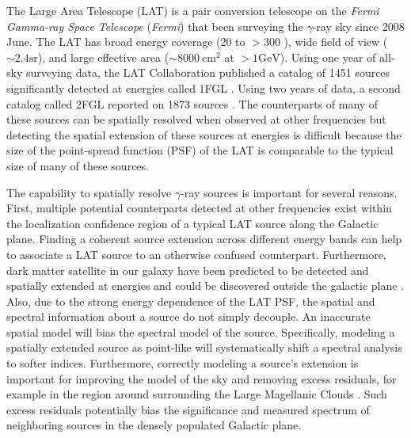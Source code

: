 \documentclass[12pt,preprint]{aastex}
\newcommand{\mev}{\text{MeV}\xspace}
\newcommand{\gev}{\text{GeV}\xspace}
\newcommand{\sr}{\text{sr}\xspace}
\newcommand{\cm}{\text{cm}\xspace}
\newcommand{\fermi}{\textit{Fermi}\xspace}
\begin{document}
{The Large Area Telescope (LAT) is a pair conversion telescope on the
{\em \fermi Gamma-ray Space Telescope} (\fermi) that been surveying the
$\gamma$-ray sky since 2008 June.  The LAT has broad energy coverage
(20 \mev to $>300$ \gev), wide field of view ($\sim 2.4 \sr$), and large
effective area ($\sim 8000\ \cm^2$ at $>1 \gev$).  
Using one year of all-sky surveying data, the LAT Collaboration published
a catalog of 1451 sources significantly detected at \gev energies called 1FGL \citep{first_cat}.
Using two years of data, a second catalog called 2FGL reported on 1873
sources \citep{second_cat}.
The counterparts of many of these sources can be spatially resolved
when observed at other frequencies but detecting the spatial extension
of these sources at \gev energies is difficult because the size of the
point-spread function (PSF) of the LAT is comparable to the typical size
of many of these sources.

The capability to spatially resolve \gev $\gamma$-ray
sources is important for several reasons.  First, multiple potential
counterparts detected at other frequencies exist within the localization
confidence region of a typical LAT source along the Galactic plane.
Finding a coherent source extension across different energy bands can
help to associate a LAT source to an otherwise confused counterpart.
Furthermore, dark matter satellite in our galaxy have been predicted to be
detected and spatially extended at \gev energies and could be discovered
outside the galactic plane \citep{pre_luanch_dark_matter_fermi}.  Also,
due to the strong energy dependence of the LAT PSF, the spatial and
spectral information about a source do not simply decouple. An inaccurate
spatial model will bias the spectral model of the source. Specifically,
modeling a spatially extended source as point-like will systematically
shift a spectral analysis to softer indices. Furthermore, correctly
modeling a source's extension is important for improving the model of
the sky and removing excess residuals, for example in the region around
surrounding the Large Magellanic Clouds \citep{first_cat}.  Such excess
residuals potentially bias the significance and measured spectrum of
neighboring sources in the densely populated Galactic plane.


}
\end{document}
